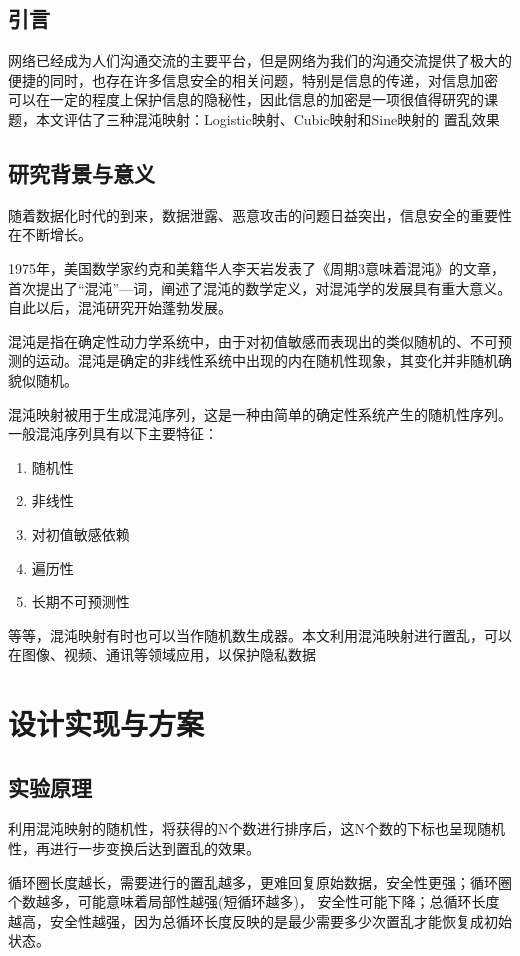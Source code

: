 \documentclass[a4paper]{article}
\begin{document}
\subsection{引言}
网络已经成为人们沟通交流的主要平台，但是网络为我们的沟通交流提供了极大的便捷的同时，也存在许多信息安全的相关问题，特别是信息的传递，对信息加密
可以在一定的程度上保护信息的隐秘性，因此信息的加密是一项很值得研究的课题，本文评估了三种混沌映射：Logistic映射、Cubic映射和Sine映射的
置乱效果\par

\subsection{研究背景与意义}
随着数据化时代的到来，数据泄露、恶意攻击的问题日益突出，信息安全的重要性在不断增长。\par
1975年，美国数学家约克和美籍华人李天岩发表了《周期3意味着混沌》的文章，首次提出了“混沌”—词，阐述了混沌的数学定义，对混沌学的发展具有重大意义。自此以后，混沌研究开始蓬勃发展。\par
混沌是指在确定性动力学系统中，由于对初值敏感而表现出的类似随机的、不可预测的运动。混沌是确定的非线性系统中出现的内在随机性现象，其变化并非随机确貌似随机。\cite{ref1}\par
混沌映射被用于生成混沌序列，这是一种由简单的确定性系统产生的随机性序列。一般混沌序列具有以下主要特征：
\begin{enumerate}
  \item 随机性
  \item 非线性
  \item 对初值敏感依赖
  \item 遍历性
  \item 长期不可预测性
\end{enumerate}
等等，混沌映射有时也可以当作随机数生成器。本文利用混沌映射进行置乱，可以在图像、视频、通讯等领域应用，以保护隐私数据

\clearpage
\section{设计实现与方案}

\subsection{实验原理}
利用混沌映射的随机性，将获得的N个数进行排序后，这N个数的下标也呈现随机性，再进行一步变换后达到置乱的效果。\par
循环圈长度越长，需要进行的置乱越多，更难回复原始数据，安全性更强；循环圈个数越多，可能意味着局部性越强(短循环越多)，
安全性可能下降；总循环长度越高，安全性越强，因为总循环长度反映的是最少需要多少次置乱才能恢复成初始状态。
\end{document}
